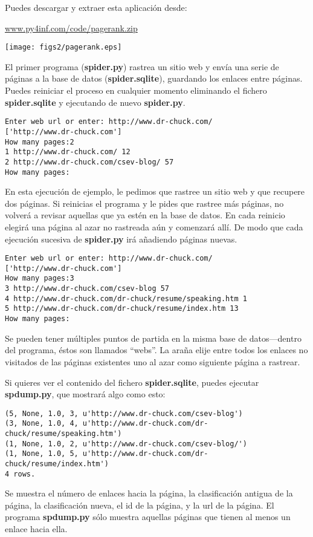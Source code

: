 Puedes descargar y extraer esta aplicación desde:

\url{www.py4inf.com/code/pagerank.zip}

\beforefig
\centerline{\texttt{[image: figs2/pagerank.eps]}}
\afterfig

El primer programa ({\bf spider.py}) rastrea un sitio web
y envía una serie de páginas a la
base de datos ({\bf spider.sqlite}), guardando los enlaces entre páginas.
Puedes reiniciar el proceso en cualquier momento eliminando el
fichero {\bf spider.sqlite} y ejecutando de nuevo {\bf spider.py}.

\beforeverb
\begin{verbatim}
Enter web url or enter: http://www.dr-chuck.com/
['http://www.dr-chuck.com']
How many pages:2
1 http://www.dr-chuck.com/ 12
2 http://www.dr-chuck.com/csev-blog/ 57
How many pages:
\end{verbatim}
\afterverb
%
En esta ejecución de ejemplo, le pedimos que rastree un sitio web y que recupere dos
páginas. Si reinicias el programa y le pides que rastree más
páginas, no volverá a revisar aquellas que ya estén en la base de datos.
En cada reinicio elegirá una página al azar no rastreada aún y comenzará allí.
De modo que cada ejecución sucesiva de {\bf spider.py} irá añadiendo páginas nuevas.

\beforeverb
\begin{verbatim}
Enter web url or enter: http://www.dr-chuck.com/
['http://www.dr-chuck.com']
How many pages:3
3 http://www.dr-chuck.com/csev-blog 57
4 http://www.dr-chuck.com/dr-chuck/resume/speaking.htm 1
5 http://www.dr-chuck.com/dr-chuck/resume/index.htm 13
How many pages:
\end{verbatim}
\afterverb
%
Se pueden tener múltiples puntos de partida en la misma base de datos---dentro
del programa, éstos son llamados ``webs''. La araña
elije entre todos los enlaces no visitados de las páginas existentes uno al azar
como siguiente página a rastrear.

Si quieres ver el contenido del fichero {\bf spider.sqlite}, puedes
ejecutar {\bf spdump.py}, que mostrará algo como esto:

\beforeverb
\begin{verbatim}
(5, None, 1.0, 3, u'http://www.dr-chuck.com/csev-blog')
(3, None, 1.0, 4, u'http://www.dr-chuck.com/dr-chuck/resume/speaking.htm')
(1, None, 1.0, 2, u'http://www.dr-chuck.com/csev-blog/')
(1, None, 1.0, 5, u'http://www.dr-chuck.com/dr-chuck/resume/index.htm')
4 rows.
\end{verbatim}
\afterverb
%
Se muestra el número de enlaces hacia la página, la clasificación antigua de la página, la
clasificación nueva, el id de la página, y la url de la página. El programa {\bf spdump.py}
sólo muestra aquellas páginas que tienen al menos un enlace hacia ella.

